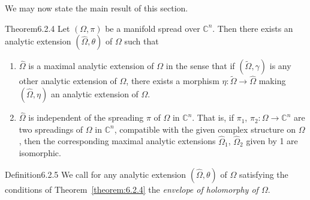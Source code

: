 We may now state the main result of this section.
\begin{originaltheorem}{Theorem}{6.2.4}
Let $(\Omega,\pi)$ be a manifold spread over $\mathbb C^n$. Then there exists an analytic extension $(\widehat\Omega,\theta)$ of $\Omega$ such that
\begin{enumerate}
\item $\widehat\Omega$ is a maximal analytic extension of $\Omega$ in the sense that if $(\widetilde\Omega,\gamma)$ is any other analytic extension of $\Omega$, there exists a morphism $\eta:\widetilde\Omega\to\widehat\Omega$ making $(\widehat\Omega,\eta)$ an analytic extension of $\Omega$.
\item $\widehat\Omega$ is independent of the spreading $\pi$ of $\Omega$ in $\mathbb C^n$. That is, if $\pi_1$, $\pi_2:\Omega\to\mathbb C^n$ are two spreadings of $\Omega$ in $\mathbb C^n$, compatible with the given complex structure on $\Omega$, then the corresponding maximal analytic extensions $\widehat\Omega_1$, $\widehat\Omega_2$ given by 1 are isomorphic.
\end{enumerate}
\end{originaltheorem}
\begin{originaltheorem}{Definition}{6.2.5}
We call for any analytic extension $(\widehat\Omega,\theta)$ of $\Omega$ satisfying the conditions of Theorem~\ref{theorem:6.2.4} the \emph{envelope of holomorphy of $\Omega$}.
\end{originaltheorem}
